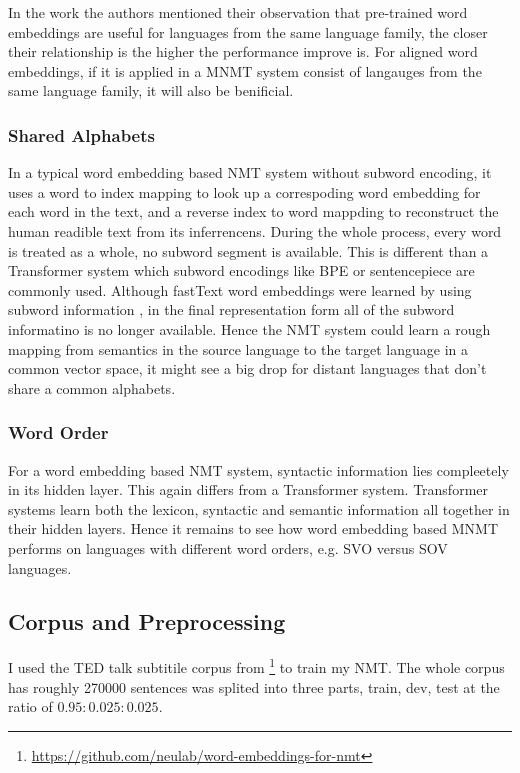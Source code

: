 \documentclass[thesis,fonts=libertine]{cluu}
\begin{document}
In the work \cite{Qi:2018aa} the authors mentioned their observation that pre-trained word embeddings are useful for languages from the same language family, the closer their relationship is the higher the performance improve is. For aligned word embeddings, if it is applied in a MNMT system consist of langauges from the same language family, it will also be benificial.

\subsubsection{Shared Alphabets}

In a typical word embedding based NMT system without subword encoding, it uses a word to index mapping to look up a correspoding word embedding for each word in the text, and a reverse index to word mappding to reconstruct the human readible text from its inferrencens. During the whole process, every word is treated as a whole, no subword segment is available. This is different than a Transformer system which subword encodings like BPE or sentencepiece are commonly used. Although fastText word embeddings were learned by using subword information \parencite{Bojanowski:2016aa}, in the final representation form all of the subword informatino is no longer available. Hence the NMT system could learn a rough mapping from semantics in the source language to the target language in a common vector space, it might see a big drop for distant languages that don't share a common alphabets.

\subsubsection{Word Order}

For a word embedding based NMT system, syntactic information lies compleetely in its hidden layer. This again differs from a Transformer system. Transformer systems learn both the lexicon, syntactic and semantic information all together in their hidden layers. Hence it remains to see how word embedding based MNMT performs on languages with different word orders, e.g. SVO versus SOV languages.

\subsection{Corpus and Preprocessing}

I used the TED talk subtitile corpus from \cite{Qi:2018aa} \footnote{\url{https://github.com/neulab/word-embeddings-for-nmt}} to train my NMT. The whole corpus has roughly 270000 sentences was splited into three parts, train, dev, test at the ratio of $0.95:0.025:0.025$.
\end{document}
